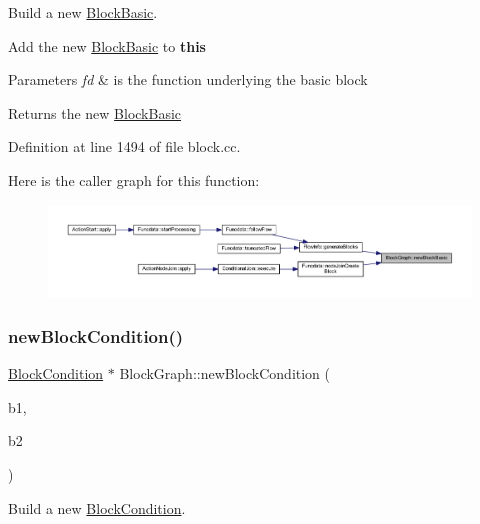 Build a new \mbox{\hyperlink{class_block_basic}{Block\+Basic}}. 

Add the new \mbox{\hyperlink{class_block_basic}{Block\+Basic}} to {\bfseries{this}} 
\begin{DoxyParams}{Parameters}
{\em fd} & is the function underlying the basic block \\
\hline
\end{DoxyParams}
\begin{DoxyReturn}{Returns}
the new \mbox{\hyperlink{class_block_basic}{Block\+Basic}} 
\end{DoxyReturn}


Definition at line 1494 of file block.\+cc.

Here is the caller graph for this function\+:
\nopagebreak
\begin{figure}[H]
\begin{center}
\leavevmode
\includegraphics[width=350pt]{class_block_graph_a0d05f223a305365c86c4b6efea82f1c0_icgraph}
\end{center}
\end{figure}
\mbox{\label{class_block_graph_a9b468774a4463d9abc43c21d032a850b}} 
\subsubsection{\texorpdfstring{newBlockCondition()}{newBlockCondition()}}
{\footnotesize\ttfamily \mbox{\hyperlink{class_block_condition}{Block\+Condition}} $\ast$ Block\+Graph\+::new\+Block\+Condition (\begin{DoxyParamCaption}\item[{\mbox{\hyperlink{class_flow_block}{Flow\+Block}} $\ast$}]{b1,  }\item[{\mbox{\hyperlink{class_flow_block}{Flow\+Block}} $\ast$}]{b2 }\end{DoxyParamCaption})}



Build a new \mbox{\hyperlink{class_block_condition}{Block\+Condition}}. 

